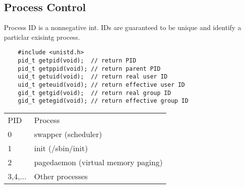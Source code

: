 \documentclass[10pt]{article}
\begin{document}
\begin{multicols}{2}
\begin{minipage}{\columnwidth}
        \subsection*{Process Control}
        Process ID is a nonnegative int. IDs are guaranteed to be unique
        and identify a particlar exisintg process.
        \begin{lstlisting}
    #include <unistd.h>
    pid_t getpid(void);  // return PID
    pid_t getppid(void); // return parent PID
    uid_t getuid(void);  // return real user ID
    uid_t geteuid(void); // return effective user ID
    gid_t getgid(void);  // return real group ID
    gid_t getegid(void); // return effective group ID
        \end{lstlisting}
        \begin{tabular}{ll}
            PID     & Process                            \\
            0       & swapper (scheduler)                \\
            1       & init (/sbin/init)                  \\
            2       & pagedaemon (virtual memory paging) \\
            3,4,... & Other processes                    \\
        \end{tabular}

\end{minipage}
\end{multicols}
\end{document}

